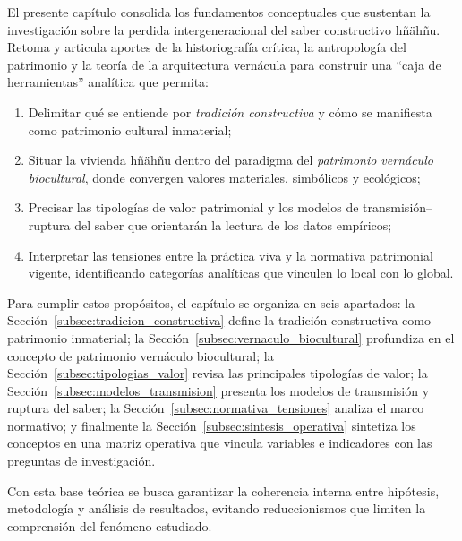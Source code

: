 El presente capítulo consolida los fundamentos conceptuales que
sustentan la investigación sobre la perdida intergeneracional del saber
constructivo hñähñu.  Retoma y articula aportes de la historiografía
crítica, la antropología del patrimonio y la teoría de la arquitectura
vernácula para construir una ``caja de herramientas'' analítica que
permita:

\begin{enumerate}
	\item Delimitar qué se entiende por \emph{tradición constructiva} y
	      cómo se manifiesta como patrimonio cultural inmaterial;
	\item Situar la vivienda hñähñu dentro del paradigma del \emph{patrimonio
		      vernáculo biocultural}, donde convergen valores materiales,
	      simbólicos y ecológicos;
	\item Precisar las tipologías de valor patrimonial y los modelos de
	      transmisión–ruptura del saber que orientarán la lectura de los
	      datos empíricos;
	\item Interpretar las tensiones entre la práctica viva y la normativa
	      patrimonial vigente, identificando categorías analíticas que
	      vinculen lo local con lo global.
\end{enumerate}

Para cumplir estos propósitos, el capítulo se organiza en seis
apartados: la Sección~\ref{subsec:tradicion_constructiva} define la
tradición constructiva como patrimonio inmaterial; la
Sección~\ref{subsec:vernaculo_biocultural} profundiza en el concepto de
patrimonio vernáculo biocultural; la
Sección~\ref{subsec:tipologias_valor} revisa las principales tipologías
de valor; la Sección~\ref{subsec:modelos_transmision} presenta los
modelos de transmisión y ruptura del saber; la
Sección~\ref{subsec:normativa_tensiones} analiza el marco normativo; y
finalmente la Sección~\ref{subsec:sintesis_operativa} sintetiza los
conceptos en una matriz operativa que vincula variables e indicadores
con las preguntas de investigación.

Con esta base teórica se busca garantizar la coherencia interna entre
hipótesis, metodología y análisis de resultados, evitando reduccionismos
que limiten la comprensión del fenómeno estudiado.
